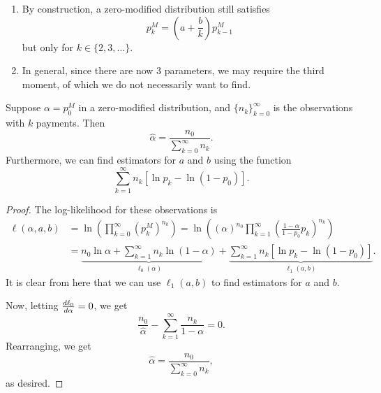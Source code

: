 \documentclass[notoc,notitlepage]{tufte-book}
\begin{document}
\begin{note}
  \begin{enumerate}
    \item By construction, a zero-modified distribution still satisfies
      \begin{equation*}
        p_k^M = \left( a + \frac{b}{k} \right) p_{k-1}^M
      \end{equation*}
      but only for $k \in \{ 2, 3, \ldots \}$.
    \item In general, since there are now 3 parameters,
      we may require the third moment,
      of which we do not necessarily want to find.
  \end{enumerate}
\end{note}

\begin{propo}\label{propo:an_estimation_for_p_0_m_in_a_zero_modified_distribution}
  Suppose $\alpha = p_0^M$ in a zero-modified distribution,
  and $\{ n_k \}_{k=0}^{\infty}$ is the observations with $k$ payments.
  Then
  \begin{equation*}
    \hat{\alpha} = \frac{n_0}{ \sum_{k=0}^{\infty} n_k }.
  \end{equation*}
  Furthermore, we can find estimators for $a$ and $b$ using the function
  \begin{equation*}
    \sum_{k=1}^{\infty} n_k [ \ln p_k - \ln (1 - p_0) ].
  \end{equation*}
\end{propo}

\begin{proof}
  The log-likelihood for these observations is
  \begin{align*}
    \ell(\alpha, a, b)
    &= \ln \left( \prod_{k=0}^{\infty} (p_k^M)^{n_k} \right)
    = \ln \left( (\alpha)^{n_0} \prod_{k=1}^{\infty} \left(
      \frac{1-\alpha}{1-p_0} p_k \right)^{n_k} \right) \\
    &= \underbrace{n_0 \ln \alpha
      + \sum_{k=1}^{\infty} n_k \ln (1 - \alpha)}_{\ell_0(\alpha)}
      + \underbrace{ \sum_{k=1}^{\infty} n_k [
        \ln p_k - \ln (1 - p_0)
      ]}_{\ell_1(a, b)}.
  \end{align*}
  It is clear from here that we can use $\ell_1(a, b)$ to find
  estimators for $a$ and $b$.

  Now, letting $\frac{\mathop{}\!d{\ell_0}}{\mathop{}\!d{\alpha}} = 0$, we get
  \begin{equation*}
    \frac{n_0}{\hat{\alpha}} - \sum_{k=1}^{\infty} \frac{n_k}{1 - \alpha} = 0.
  \end{equation*} 
  Rearranging, we get
  \begin{equation*}
    \hat{\alpha} = \frac{n_0}{ \sum_{k=0}^{\infty} n_k },
  \end{equation*}
  as desired.
\end{proof}
\end{document}
